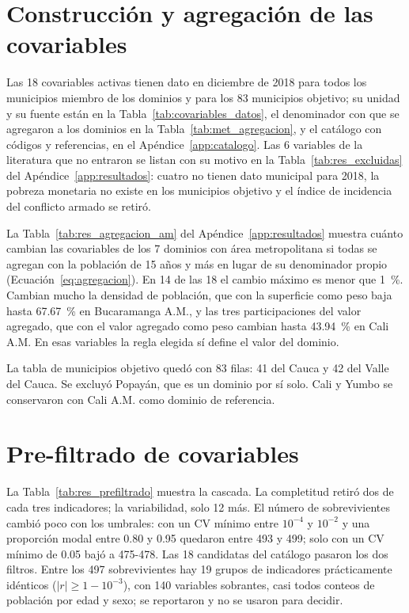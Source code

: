 \section{Construcción y agregación de las covariables}
\label{sec:res_covariables}

Las 18 covariables activas tienen dato en diciembre de 2018 para todos los municipios miembro de los dominios y para los 83 municipios objetivo; su unidad y su fuente están en la Tabla~\ref{tab:covariables_datos}, el denominador con que se agregaron a los dominios en la Tabla~\ref{tab:met_agregacion}, y el catálogo con códigos y referencias, en el Apéndice~\ref{app:catalogo}. Las 6 variables de la literatura que no entraron se listan con su motivo en la Tabla~\ref{tab:res_excluidas} del Apéndice~\ref{app:resultados}: cuatro no tienen dato municipal para 2018, la pobreza monetaria no existe en los municipios objetivo y el índice de incidencia del conflicto armado se retiró.

La Tabla~\ref{tab:res_agregacion_am} del Apéndice~\ref{app:resultados} muestra cuánto cambian las covariables de los 7 dominios con área metropolitana si todas se agregan con la población de 15 años y más en lugar de su denominador propio (Ecuación~\ref{eq:agregacion}). En 14 de las 18 el cambio máximo es menor que 1~\%. Cambian mucho la densidad de población, que con la superficie como peso baja hasta 67.67~\% en Bucaramanga A.M., y las tres participaciones del valor agregado, que con el valor agregado como peso cambian hasta 43.94~\% en Cali A.M. En esas variables la regla elegida sí define el valor del dominio.

La tabla de municipios objetivo quedó con 83 filas: 41 del Cauca y 42 del Valle del Cauca. Se excluyó Popayán, que es un dominio por sí solo. Cali y Yumbo se conservaron con Cali A.M. como dominio de referencia.

\section{Pre-filtrado de covariables}
\label{sec:res_prefiltrado}

La Tabla~\ref{tab:res_prefiltrado} muestra la cascada. La completitud retiró dos de cada tres indicadores; la variabilidad, solo 12 más. El número de sobrevivientes cambió poco con los umbrales: con un CV mínimo entre $10^{-4}$ y $10^{-2}$ y una proporción modal entre 0.80 y 0.95 quedaron entre 493 y 499; solo con un CV mínimo de 0.05 bajó a 475-478. Las 18 candidatas del catálogo pasaron los dos filtros. Entre los 497 sobrevivientes hay 19 grupos de indicadores prácticamente idénticos ($|r| \geq 1 - 10^{-3}$), con 140 variables sobrantes, casi todos conteos de población por edad y sexo; se reportaron y no se usaron para decidir.

